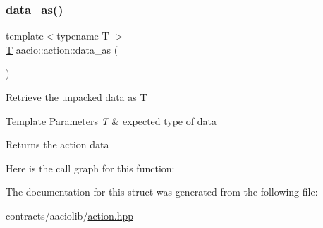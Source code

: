 \subsubsection{\texorpdfstring{data\+\_\+as()}{data\_as()}}
{\footnotesize\ttfamily template$<$typename T $>$ \\
\mbox{\hyperlink{struct_t}{T}} aacio\+::action\+::data\+\_\+as (\begin{DoxyParamCaption}{ }\end{DoxyParamCaption})\hspace{0.3cm}{\ttfamily [inline]}}

Retrieve the unpacked data as \mbox{\hyperlink{struct_t}{T}} 
\begin{DoxyTemplParams}{Template Parameters}
{\em \mbox{\hyperlink{struct_t}{T}}} & expected type of data \\
\hline
\end{DoxyTemplParams}
\begin{DoxyReturn}{Returns}
the action data 
\end{DoxyReturn}
Here is the call graph for this function\+:


The documentation for this struct was generated from the following file\+:\begin{DoxyCompactItemize}
\item 
contracts/aaciolib/\mbox{\hyperlink{action_8hpp}{action.\+hpp}}\end{DoxyCompactItemize}
